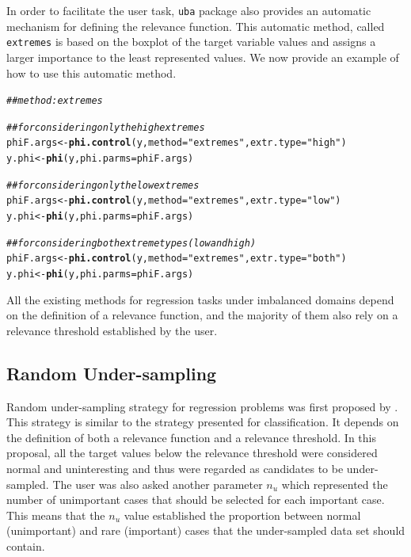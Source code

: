 \documentclass[10pt,a4paper]{article}\usepackage[]{graphicx}\usepackage[]{color}
\makeatletter
\newcommand{\hlstr}[1]{\textcolor[rgb]{0.192,0.494,0.8}{#1}}%
\newcommand{\hlcom}[1]{\textcolor[rgb]{0.678,0.584,0.686}{\textit{#1}}}%
\newcommand{\hlstd}[1]{\textcolor[rgb]{0.345,0.345,0.345}{#1}}%
\newcommand{\hlkwb}[1]{\textcolor[rgb]{0.69,0.353,0.396}{#1}}%
\newcommand{\hlkwc}[1]{\textcolor[rgb]{0.333,0.667,0.333}{#1}}%
\newcommand{\hlkwd}[1]{\textcolor[rgb]{0.737,0.353,0.396}{\textbf{#1}}}%
\newenvironment{kframe}{%
 \def\at@end@of@kframe{}%
 \ifinner\ifhmode%
  \def\at@end@of@kframe{\end{minipage}}%
  \begin{minipage}{\columnwidth}%
 \fi\fi%
 \def\FrameCommand##1{\hskip\@totalleftmargin \hskip-\fboxsep
 \colorbox{shadecolor}{##1}\hskip-\fboxsep
     \hskip-\linewidth \hskip-\@totalleftmargin \hskip\columnwidth}%
 \MakeFramed {\advance\hsize-\width
   \@totalleftmargin\z@ \linewidth\hsize
   \@setminipage}}%
 {\par\unskip\endMakeFramed%
 \at@end@of@kframe}
\newenvironment{knitrout}{}{} %
\makeatother
\begin{document}
In order to facilitate the user task, \texttt{uba} package also provides an automatic mechanism for defining the relevance function. This automatic method, called \texttt{extremes} is based on the boxplot of the target variable values and assigns a larger importance to the least represented values. We now provide an example of how to use this automatic method.

\begin{knitrout}\footnotesize
{}\color{fgcolor}\begin{kframe}
\begin{alltt}
\hlcom{## method: extremes}

\hlcom{## for considering only the high extremes}
\hlstd{phiF.args} \hlkwb{<-} \hlkwd{phi.control}\hlstd{(y,}\hlkwc{method}\hlstd{=}\hlstr{"extremes"}\hlstd{,}\hlkwc{extr.type}\hlstd{=}\hlstr{"high"}\hlstd{)}
\hlstd{y.phi} \hlkwb{<-} \hlkwd{phi}\hlstd{(y,}\hlkwc{phi.parms}\hlstd{=phiF.args)}

\hlcom{## for considering only the low extremes}
\hlstd{phiF.args} \hlkwb{<-} \hlkwd{phi.control}\hlstd{(y,}\hlkwc{method}\hlstd{=}\hlstr{"extremes"}\hlstd{,}\hlkwc{extr.type}\hlstd{=}\hlstr{"low"}\hlstd{)}
\hlstd{y.phi} \hlkwb{<-} \hlkwd{phi}\hlstd{(y,}\hlkwc{phi.parms}\hlstd{=phiF.args)}

\hlcom{## for considering both extreme types (low and high)}
\hlstd{phiF.args} \hlkwb{<-} \hlkwd{phi.control}\hlstd{(y,}\hlkwc{method}\hlstd{=}\hlstr{"extremes"}\hlstd{,}\hlkwc{extr.type}\hlstd{=}\hlstr{"both"}\hlstd{)}
\hlstd{y.phi} \hlkwb{<-} \hlkwd{phi}\hlstd{(y,}\hlkwc{phi.parms}\hlstd{=phiF.args)}
\end{alltt}
\end{kframe}
\end{knitrout}

All the existing methods for regression tasks under imbalanced domains depend on the definition of a relevance function, and the majority of them also rely on a relevance threshold established by the user.


\subsection{Random Under-sampling}\label{sec:RURegress}

Random under-sampling strategy for regression problems was first proposed by \cite{torgo2013smote}. This strategy is similar to the strategy presented for classification. It depends on the definition of both a relevance function and a relevance threshold. In this proposal, all the target values below the relevance threshold were considered normal and uninteresting and thus were regarded as candidates to be under-sampled. The user was also asked another parameter $n_u$ which represented the number of unimportant cases that should be selected for each important case. This means that the $n_u$ value established the proportion between normal (unimportant) and rare (important) cases that the under-sampled data set should contain.
\end{document}
